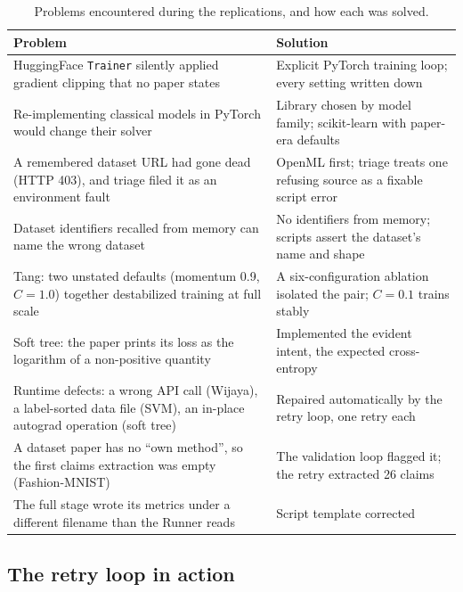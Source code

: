 \documentclass[11pt]{article}
\begin{document}
\begin{table}[tbp]
\centering
\small
\caption{Problems encountered during the replications, and how each was solved.}
\label{tab:problems}
\begin{tabular}{L{0.44\textwidth}L{0.48\textwidth}}
\toprule
Problem & Solution \\
\midrule
HuggingFace \texttt{Trainer} silently applied gradient clipping that no paper states
  & Explicit PyTorch training loop; every setting written down \\
Re-implementing classical models in PyTorch would change their solver
  & Library chosen by model family; scikit-learn with paper-era defaults \\
A remembered dataset URL had gone dead (HTTP 403), and triage filed it as an environment fault
  & OpenML first; triage treats one refusing source as a fixable script error \\
Dataset identifiers recalled from memory can name the wrong dataset
  & No identifiers from memory; scripts assert the dataset's name and shape \\
Tang: two unstated defaults (momentum 0.9, $C = 1.0$) together destabilized training at full
  scale & A six-configuration ablation isolated the pair; $C = 0.1$ trains stably \\
Soft tree: the paper prints its loss as the logarithm of a non-positive quantity
  & Implemented the evident intent, the expected cross-entropy \\
Runtime defects: a wrong API call (Wijaya), a label-sorted data file (SVM), an in-place
  autograd operation (soft tree) & Repaired automatically by the retry loop, one retry each \\
A dataset paper has no ``own method'', so the first claims extraction was empty (Fashion-MNIST)
  & The validation loop flagged it; the retry extracted 26 claims \\
The full stage wrote its metrics under a different filename than the Runner reads
  & Script template corrected \\
\bottomrule
\end{tabular}
\end{table}

\subsection{The retry loop in action}
\end{document}
